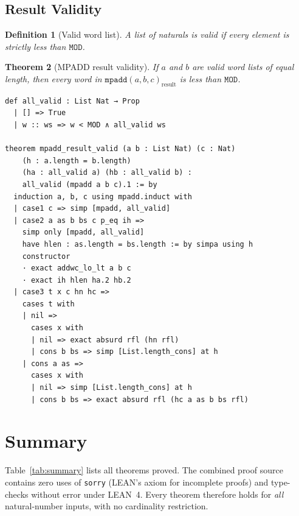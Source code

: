 \documentclass[11pt,a4paper]{article}
\newtheorem{theorem}{Theorem}[section]
\newtheorem{definition}[theorem]{Definition}
\begin{document}
\subsection{Result Validity}

\begin{definition}[Valid word list]
A list of naturals is \emph{valid} if every element is strictly less
than $\mathtt{MOD}$.
\end{definition}

\begin{theorem}[MPADD result validity]
\label{thm:mpadd-valid}
If $a$ and $b$ are valid word lists of equal length, then every word
in $\mathtt{mpadd}(a,b,c)_{\mathrm{result}}$ is less than $\mathtt{MOD}$.
\end{theorem}

\begin{lstlisting}[style=lean,caption={MPADD result words are valid}]
def all_valid : List Nat → Prop
  | [] => True
  | w :: ws => w < MOD ∧ all_valid ws

theorem mpadd_result_valid (a b : List Nat) (c : Nat)
    (h : a.length = b.length)
    (ha : all_valid a) (hb : all_valid b) :
    all_valid (mpadd a b c).1 := by
  induction a, b, c using mpadd.induct with
  | case1 c => simp [mpadd, all_valid]
  | case2 a as b bs c p_eq ih =>
    simp only [mpadd, all_valid]
    have hlen : as.length = bs.length := by simpa using h
    constructor
    · exact addwc_lo_lt a b c
    · exact ih hlen ha.2 hb.2
  | case3 t x c hn hc =>
    cases t with
    | nil =>
      cases x with
      | nil => exact absurd rfl (hn rfl)
      | cons b bs => simp [List.length_cons] at h
    | cons a as =>
      cases x with
      | nil => simp [List.length_cons] at h
      | cons b bs => exact absurd rfl (hc a as b bs rfl)
\end{lstlisting}

\section{Summary}
\label{sec:summary}

Table~\ref{tab:summary} lists all theorems proved.  The combined proof
source contains zero uses of \texttt{sorry} (LEAN's axiom for
incomplete proofs) and type-checks without error under LEAN~4.  Every
theorem therefore holds for \emph{all} natural-number inputs, with no
cardinality restriction.
\end{document}
